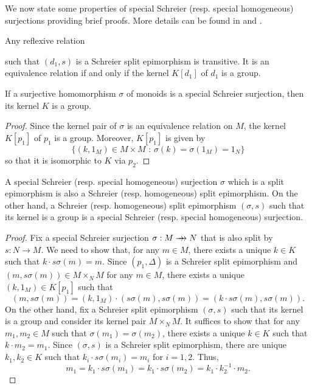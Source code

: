 We now state some properties of special Schreier (resp. special homogeneous) surjections providing brief proofs. More details can be found in \cite{bourn2014schreierSemirings} and \cite{bourn2014schreier}. 
\begin{theorem}
    Any reflexive relation
    \begin{center}
    \end{center}
    such that $(d_1,s)$ is a Schreier split epimorphism is transitive. It is an equivalence relation if and only if the kernel $K[d_1]$ of $d_1$ is a group.
\end{theorem}
\begin{corollary}
\label{cor:KernelGroup}
    If a surjective homomorphism $\sigma$ of monoids is a special Schreier surjection, then its kernel $K$ is a group.
    \begin{proof}
        Since the kernel pair of $\sigma$ is an equivalence relation on $M$, the kernel $K[p_1]$ of $p_1$ is a group. Moreover, $K[p_1]$ is given by
        \[ \{(k,1_M)\in M\times M\text{ : }\sigma(k)=\sigma(1_M)=1_N\} \]
        so that it is isomorphic to $K$ via $p_2$.
    \end{proof}
\end{corollary}
\begin{corollary}
\label{cor:split+group=special}
    A special Schreier (resp. special homogeneous) surjection $\sigma$ which is a split epimorphism is also a Schreier (resp. homogeneous) split epimorphism. On the other hand, a Schreier (resp. homogeneous) split epimorphism $(\sigma,s)$ such that its kernel is a group is a special Schreier (resp. special homogeneous) surjection.
    \begin{proof}
        Fix a special Schreier surjection $\sigma:M\rrightarrow N$ that is also split by $s:N\to M$. We need to show that, for any $m\in M$, there exists a unique $k\in K$ such that $k\cdot s\sigma(m) = m$. Since $(p_1,\Delta)$ is a Schreier split epimorphism and $(m,s\sigma(m))\in M\times_NM$ for any $m\in M$, there exists a unique $(k,1_M)\in K[p_1]$ such that
        \[ (m,s\sigma(m)) = (k,1_M)\cdot (s\sigma(m), s\sigma(m)) = (k\cdot s\sigma(m), s\sigma(m)). \]
        On the other hand, fix a Schreier split epimorphism $(\sigma,s)$ such that its kernel is a group and consider its kernel pair $M\times_NM$. It suffices to show that for any $m_1,m_2\in M$ such that $\sigma(m_1) = \sigma(m_2)$, there exists a unique $k\in K$ such that $k\cdot m_2 = m_1$. Since $(\sigma, s)$ is a Schreier split epimorphism, there are unique $k_1,k_2\in K$ such that $k_i\cdot s\sigma(m_i)=m_i$ for $i=1,2$. Thus,
        \[ m_1 = k_1\cdot s\sigma(m_1) = k_1\cdot s\sigma(m_2) = k_1\cdot k_2^{-1}\cdot m_2. \]
    \end{proof}
\end{corollary}
